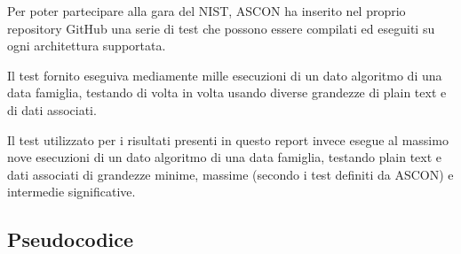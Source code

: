 \documentclass{report}
\begin{document}
Per poter partecipare alla gara del NIST, ASCON ha inserito nel proprio repository GitHub una serie di test che possono essere compilati ed eseguiti su ogni architettura supportata.

Il test fornito eseguiva mediamente mille esecuzioni di un dato algoritmo di una data famiglia, testando di volta in volta usando diverse grandezze di plain text e di dati associati.

Il test utilizzato per i risultati presenti in questo report invece esegue al massimo nove esecuzioni di un dato algoritmo di una data famiglia, testando plain text e dati associati di grandezze minime, massime (secondo i test definiti da ASCON) e intermedie significative.

\subsection{Pseudocodice}
\end{document}
